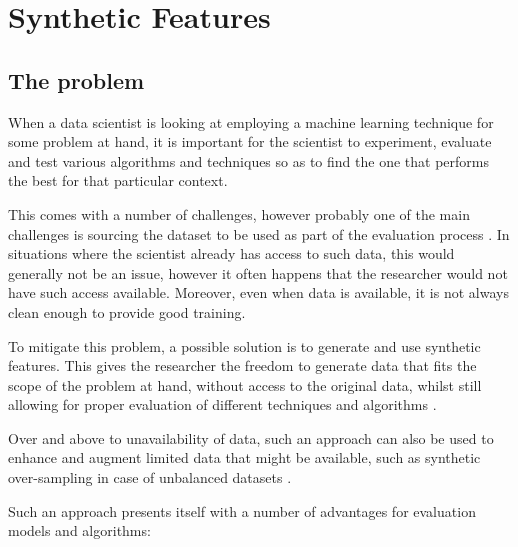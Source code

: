 \chapter{Synthetic Features}
\label{ch:synthetic features}

\section{The problem}
When a data scientist is looking at employing a machine learning technique for some problem at hand, it is important for the scientist to experiment, evaluate and test various algorithms and techniques so as to find the one that performs the best for that particular context.

This comes with a number of challenges, however probably one of the main challenges is sourcing the dataset to be used as part of the evaluation process \citep{patki2016}. In situations where the scientist already has access to such data, this would generally not be an issue, however it often happens that the researcher would not have such access available. Moreover, even when data is available, it is not always clean enough to provide good training.

To mitigate this problem, a possible solution is to generate and use synthetic features. This gives the researcher the freedom to generate data that fits the scope of the problem at hand, without access to the original data, whilst still allowing for proper evaluation of different techniques and algorithms \citep{patki2016}.

Over and above to unavailability of data, such an approach can also be used to enhance and augment limited data that might be available, such as synthetic over-sampling in case of unbalanced datasets \citep{tallo2018}.

Such an approach presents itself with a number of advantages for evaluation models and algorithms:

